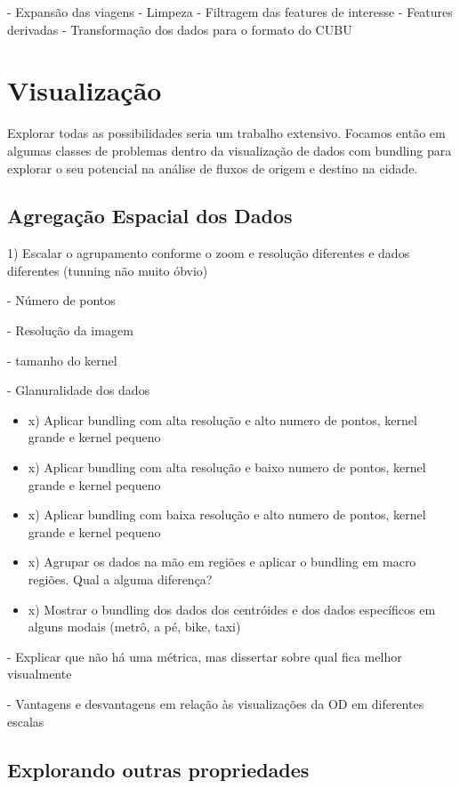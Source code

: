  - Expansão das viagens
 - Limpeza
 - Filtragem das features de interesse
 - Features derivadas
 - Transformação dos dados para o formato do CUBU

\section{Visualização}

  Explorar todas as possibilidades seria um trabalho extensivo. Focamos
então em algumas classes de problemas dentro da visualização de dados
com bundling para explorar o seu potencial na análise de fluxos de origem e
destino na cidade.

\subsection{Agregação Espacial dos Dados}

1) Escalar o agrupamento conforme o zoom e resolução diferentes e dados diferentes (tunning não muito óbvio)

	- Número de pontos

	- Resolução da imagem

	- tamanho do kernel

	- Glanuralidade dos dados

  \begin{itemize}
    \item x) Aplicar bundling com alta resolução e alto numero de pontos, kernel grande e kernel pequeno
    \item x) Aplicar bundling com alta resolução e baixo numero de pontos, kernel grande e kernel pequeno
    \item x) Aplicar bundling com baixa resolução e alto numero de pontos, kernel grande e kernel pequeno
    \item x) Agrupar os dados na mão em regiões e aplicar o bundling em macro regiões. Qual a alguma diferença?
    \item x) Mostrar o bundling dos dados dos centróides e dos dados específicos em alguns modais (metrô, a pé, bike, taxi)
  \end{itemize}

	- Explicar que não há uma métrica, mas dissertar sobre qual fica melhor visualmente

	- Vantagens e desvantagens em relação às visualizações da OD em diferentes escalas

\subsection{Explorando outras propriedades}

